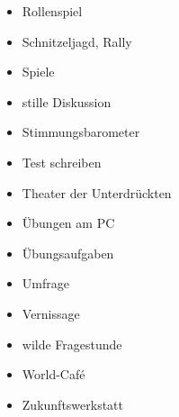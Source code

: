 \begin{itemize}
    \item Rollenspiel
    \item Schnitzeljagd, Rally
    \item Spiele
    \item stille Diskussion
    \item Stimmungsbarometer
    \item Test schreiben
    \item Theater der Unterdrückten
    \item Übungen am PC
    \item Übungsaufgaben
    \item Umfrage
    \item Vernissage
    \item wilde Fragestunde
    \item World-Café
    \item Zukunftswerkstatt
\end{itemize}

\onecolumn
